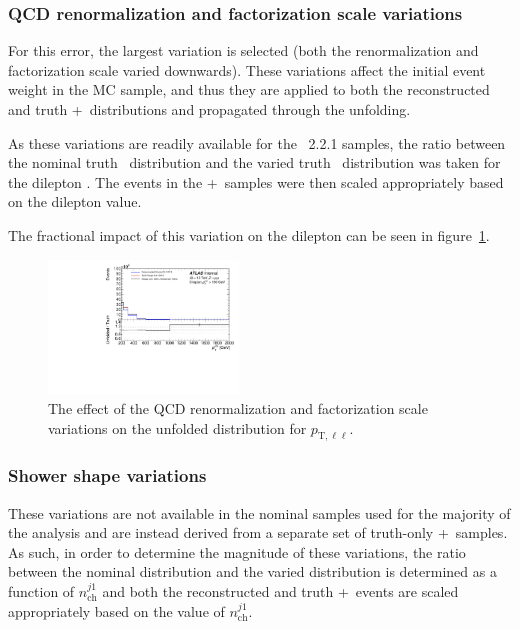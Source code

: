 \subsubsection{QCD renormalization and factorization scale variations}
For this error, the largest variation is selected (both the renormalization and factorization scale varied downwards). These variations affect the initial event weight in the MC sample, and thus they are applied to both the reconstructed and truth \powheg+\pythia~distributions and propagated through the unfolding.

As these variations are readily available for the \sherpa~2.2.1 samples, the ratio between the nominal truth \sherpa~distribution and the varied truth \sherpa~distribution was taken for the dilepton \pt. The events in the \powheg+\pythia~samples were then scaled appropriately based on the dilepton \pt value.

The fractional impact of this variation on the dilepton \pt can be seen in figure~\ref{fig:qcdSystErr}.

\begin{figure}[h!]
  \centering
  \includegraphics[page=38,width=0.45\textwidth]{figures/IBUPlots.pdf}
  \caption{The effect of the QCD renormalization and factorization scale variations on the unfolded distribution for $p_{\text{T},\ell\ell}$.}
  \label{fig:qcdSystErr}
\end{figure}

\subsubsection{Shower shape variations}
These variations are not available in the nominal samples used for the majority of the analysis and are instead derived from a separate set of truth-only \powheg+\pythia~samples. As such, in order to determine the magnitude of these variations, the ratio between the nominal distribution and the varied distribution is determined as a function of $n_{\text{ch}}^{j1}$ and both the reconstructed and truth \powheg+\pythia~events are scaled appropriately based on the value of $n_{\text{ch}}^{j1}$.

